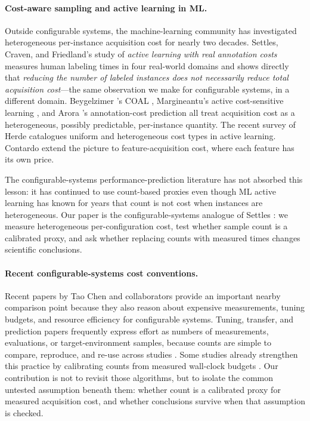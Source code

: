\paragraph*{Cost-aware sampling and active learning in ML.}
Outside configurable systems, the machine-learning community has
investigated heterogeneous per-instance acquisition cost for nearly two
decades. Settles, Craven, and Friedland's
 study of
\emph{active learning with real annotation costs} measures human labeling
times in four real-world domains and shows directly that
\emph{reducing the number of labeled instances does not necessarily reduce
total acquisition cost}---the same observation we make for configurable
systems, in a different domain. Beygelzimer \etal{}'s COAL
, Margineantu's active cost-sensitive
learning , and Arora \etal{}'s annotation-cost
prediction  all treat acquisition cost as a
heterogeneous, possibly predictable, per-instance quantity. The recent
survey of Herde \etal{}  catalogues uniform and
heterogeneous cost types in active learning. Contardo
\etal{}  extend the picture to feature-acquisition
cost, where each feature has its own price.

The configurable-systems performance-prediction literature has not absorbed
this lesson: it has continued to use count-based proxies even though ML
active learning has known for years that count is not cost when instances
are heterogeneous. Our paper is the configurable-systems analogue of
Settles \etal: we measure heterogeneous per-configuration cost, test
whether sample count is a calibrated proxy, and ask whether replacing
counts with measured times changes scientific conclusions.

\paragraph*{Recent configurable-systems cost conventions.}
Recent papers by Tao Chen and collaborators provide an important nearby
comparison point because they also reason about expensive measurements,
tuning budgets, and resource efficiency for configurable systems. Tuning,
transfer, and prediction papers frequently express effort as numbers of
measurements, evaluations, or target-environment samples, because counts are
simple to compare, reproduce, and re-use across studies
\cite{chen2021multiobj,chen2023aspirations,chen2024admmo,gong2024sempl}. Some
studies already strengthen this practice by calibrating counts from measured
wall-clock budgets \cite{chen2021multiobj,chen2023aspirations}. Our
contribution is not to revisit those algorithms, but to isolate the common
untested assumption beneath them: whether count is a calibrated proxy for
measured acquisition cost, and whether conclusions survive when that assumption
is checked.


